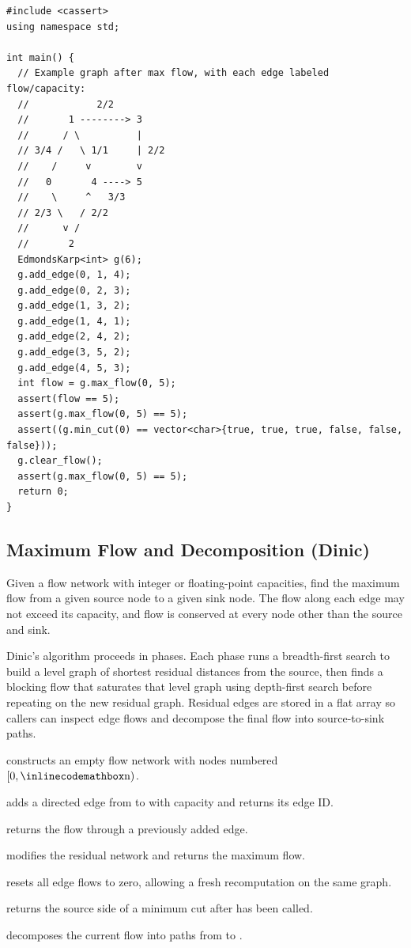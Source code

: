 \begin{lstlisting}[style=cpp]
#include <cassert>
using namespace std;

int main() {
  // Example graph after max flow, with each edge labeled flow/capacity:
  //            2/2
  //       1 --------> 3
  //      / \          |
  // 3/4 /   \ 1/1     | 2/2
  //    /     v        v
  //   0       4 ----> 5
  //    \     ^   3/3
  // 2/3 \   / 2/2
  //      v /
  //       2
  EdmondsKarp<int> g(6);
  g.add_edge(0, 1, 4);
  g.add_edge(0, 2, 3);
  g.add_edge(1, 3, 2);
  g.add_edge(1, 4, 1);
  g.add_edge(2, 4, 2);
  g.add_edge(3, 5, 2);
  g.add_edge(4, 5, 3);
  int flow = g.max_flow(0, 5);
  assert(flow == 5);
  assert(g.max_flow(0, 5) == 5);
  assert((g.min_cut(0) == vector<char>{true, true, true, false, false, false}));
  g.clear_flow();
  assert(g.max_flow(0, 5) == 5);
  return 0;
}
\end{lstlisting}
\subsection{Maximum Flow and Decomposition (Dinic)}
\label{sec:4.5.3}
Given a flow network with integer or floating-point capacities, find the maximum flow from a given source node to a given sink node. The flow along each edge may not exceed its capacity, and flow is conserved at every node other than the source and sink.

Dinic's algorithm proceeds in phases. Each phase runs a breadth-first search to build a level graph of shortest residual distances from the source, then finds a blocking flow that saturates that level graph using depth-first search before repeating on the new residual graph. Residual edges are stored in a flat array so callers can inspect edge flows and decompose the final flow into source-to-sink paths.

\begin{compactitem}
  \item {} constructs an empty flow network with nodes numbered $[0, {\inlinecodemath{n}})$.
  \item {} adds a directed edge from  to  with capacity  and returns its edge ID.
  \item {} returns the flow through a previously added edge.
  \item {} modifies the residual network and returns the maximum flow.
  \item {} resets all edge flows to zero, allowing a fresh recomputation on the same graph.
  \item {} returns the source side of a minimum cut after  has been called.
  \item {} decomposes the current flow into paths from  to .
\end{compactitem}

